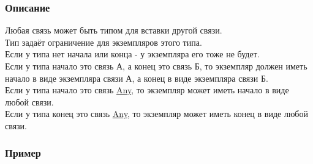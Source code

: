\documentclass{article}
\begin{document}
\subsubsection{Описание}
Любая связь может быть типом для вставки другой связи. \\
Тип задаёт ограничение для экземпляров этого типа. \\
Если у типа нет начала или конца - у экземпляра его тоже не будет. \\
Если у типа начало это связь А, а конец это связь Б, то экземпляр должен иметь начало в виде экземпляра связи А, а конец в виде экземпляра связи Б. \\
Если у типа начало это связь \hyperlink{Core.Any.Def}{Any}, то экземпляр может иметь начало в виде любой связи. \\
Если у типа конец это связь \hyperlink{Core.Any.Def}{Any}, то экземпляр может иметь конец в виде любой связи. \\

\subsubsection{Пример}
\end{document}

